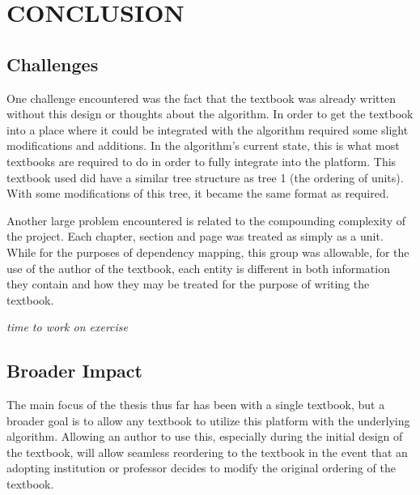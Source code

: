 %
%
%
%

\chapter{CONCLUSION}

\section{Challenges}

One challenge encountered was the fact that the textbook was already written without this design or thoughts about the algorithm. In order to get the textbook into a place where it could be integrated with the algorithm required some slight modifications and additions. In the algorithm's current state, this is what most textbooks are required to do in order to fully integrate into the platform. This textbook used did have a similar tree structure as tree 1 (the ordering of units). With some modifications of this tree, it became the same format as required.

Another large problem encountered is related to the compounding complexity of the project. Each chapter, section and page was treated as simply as a unit. While for the purposes of dependency mapping, this group was allowable, for the use of the author of the textbook, each entity is different in both information they contain and how they may be treated for the purpose of writing the textbook.

\textit{time to work on exercise}

\section{Broader Impact}

The main focus of the thesis thus far has been with a single textbook, but a broader goal is to allow any textbook to utilize this platform with the underlying algorithm. Allowing an author to use this, especially during the initial design of the textbook, will allow seamless reordering to the textbook in the event that an adopting institution or professor decides to modify the original ordering of the textbook.

